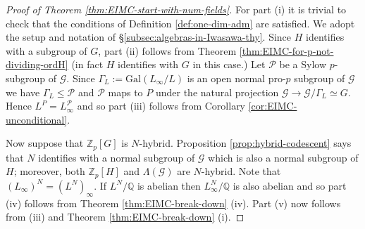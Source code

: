 \documentclass[12pt]{amsart}
\theoremstyle{plain}
\theoremstyle{remark}
\theoremstyle{definition}
\numberwithin{equation}{section}
\begin{document}
\begin{proof}[Proof of Theorem \ref{thm:EIMC-start-with-num-fields}]
For part (i) it is trivial to check that the conditions of Definition \ref{def:one-dim-adm} are satisfied.
We adopt the setup and notation of \S \ref{subsec:algebras-in-Iwasawa-thy}.
Since $H$ identifies with a subgroup  of $G$, part (ii) follows from Theorem \ref{thm:EIMC-for-p-not-dividing-ordH}
(in fact $H$ identifies with $G$ in this case.)
Let $\mathcal{P}$ be a Sylow $p$-subgroup of $\mathcal{G}$.
Since $\Gamma_{L}:={\mathrm{Gal}}(L_{\infty}/L)$ is an open normal pro-$p$ subgroup of $\mathcal{G}$
we have $\Gamma_{L} \leq \mathcal{P}$ and $\mathcal{P}$ maps to $P$ under the natural 
projection $\mathcal{G} \rightarrow \mathcal{G}/\Gamma_{L} \simeq G$.
Hence $L^{P}=L_{\infty}^{\mathcal{P}}$ and so part (iii) follows from Corollary \ref{cor:EIMC-unconditional}.

Now suppose that ${\mathbb{Z}}_{p}[G]$ is $N$-hybrid.
Proposition \ref{prop:hybrid-codescent} says that $N$ identifies with a normal subgroup of $\mathcal{G}$ which is also a normal subgroup of $H$;
moreover, both ${\mathbb{Z}}_{p}[H]$ and $\Lambda(\mathcal{G})$ are $N$-hybrid. 
Note that $(L_{\infty})^{N}=(L^{N})_{\infty}$.
If $L^{N}/{\mathbb{Q}}$ is abelian then $L_{\infty}^{N}/{\mathbb{Q}}$ is also abelian and so part (iv) follows from 
Theorem \ref{thm:EIMC-break-down} (iv).
Part (v) now follows from (iii) and Theorem \ref{thm:EIMC-break-down} (i).
\end{proof}
\end{document}
